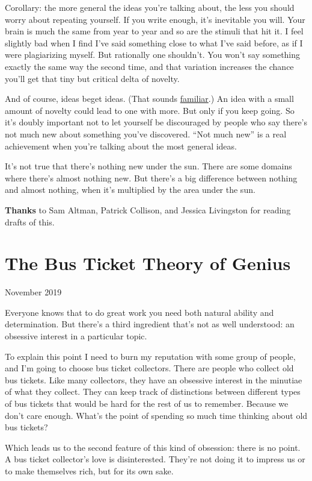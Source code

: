 \documentclass[12pt]{book}
\begin{document}
Corollary: the more general the ideas you're talking about, the less you
should worry about repeating yourself. If you write enough, it's
inevitable you will. Your brain is much the same from year to year and
so are the stimuli that hit it. I feel slightly bad when I find I've
said something close to what I've said before, as if I were plagiarizing
myself. But rationally one shouldn't. You won't say something exactly
the same way the second time, and that variation increases the chance
you'll get that tiny but critical delta of novelty.

And of course, ideas beget ideas. (That sounds
\href{ecw.html}{familiar}.) An idea with a small amount of novelty could
lead to one with more. But only if you keep going. So it's doubly
important not to let yourself be discouraged by people who say there's
not much new about something you've discovered. ``Not much new'' is a
real achievement when you're talking about the most general ideas.

It's not true that there's nothing new under the sun. There are some
domains where there's almost nothing new. But there's a big difference
between nothing and almost nothing, when it's multiplied by the area
under the sun.

\textbf{Thanks} to Sam Altman, Patrick Collison, and Jessica Livingston
for reading drafts of this.
\chapter{The Bus Ticket Theory of Genius}

November 2019

Everyone knows that to do great work you need both natural ability and
determination. But there's a third ingredient that's not as well
understood: an obsessive interest in a particular topic.

To explain this point I need to burn my reputation with some group of
people, and I'm going to choose bus ticket collectors. There are people
who collect old bus tickets. Like many collectors, they have an
obsessive interest in the minutiae of what they collect. They can keep
track of distinctions between different types of bus tickets that would
be hard for the rest of us to remember. Because we don't care enough.
What's the point of spending so much time thinking about old bus
tickets?

Which leads us to the second feature of this kind of obsession: there is
no point. A bus ticket collector's love is disinterested. They're not
doing it to impress us or to make themselves rich, but for its own sake.
\end{document}
